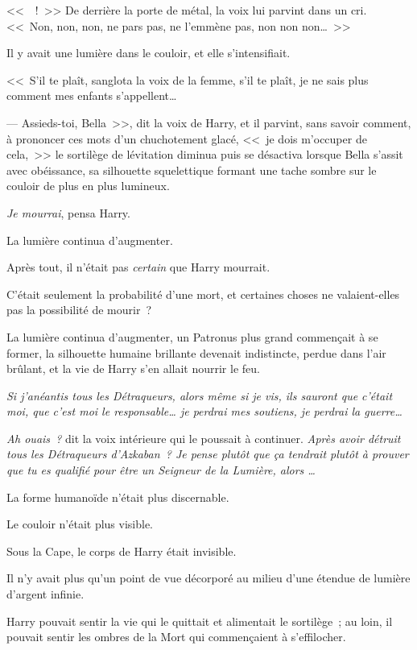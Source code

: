 <<~~!~>> De derrière la porte de métal, la voix lui parvint dans un cri. <<~Non, non, non, ne pars pas, ne l'emmène pas, non non non…~>>

Il y avait une lumière dans le couloir, et elle s'intensifiait.

<<~S'il te plaît, sanglota la voix de la femme, s'il te plaît, je ne sais plus comment mes enfants s'appellent…

--- Assieds-toi, Bella~>>, dit la voix de Harry, et il parvint, sans savoir comment, à prononcer ces mots d'un chuchotement glacé, <<~je dois m'occuper de cela,~>> le sortilège de lévitation diminua puis se désactiva lorsque Bella s'assit avec obéissance, sa silhouette squelettique formant une tache sombre sur le couloir de plus en plus lumineux.

\emph{Je mourrai}, pensa Harry.

La lumière continua d'augmenter.

Après tout, il n'était pas \emph{certain} que Harry mourrait.

C'était seulement la probabilité d'une mort, et certaines choses ne valaient-elles pas la possibilité de mourir~?

La lumière continua d'augmenter, un Patronus plus grand commençait à se former, la silhouette humaine brillante devenait indistincte, perdue dans l'air brûlant, et la vie de Harry s'en allait nourrir le feu.

\emph{Si j'anéantis tous les Détraqueurs, alors même si je vis, ils sauront que c'était moi, que c'est moi le responsable… je perdrai mes soutiens, je perdrai la guerre…}

\emph{Ah ouais~?} dit la voix intérieure qui le poussait à continuer. \emph{Après avoir détruit tous les Détraqueurs d'Azkaban~? Je pense plutôt que ça tendrait plutôt à prouver que tu es qualifié pour être un Seigneur de la Lumière, alors …}

La forme humanoïde n'était plus discernable.

Le couloir n'était plus visible.

Sous la Cape, le corps de Harry était invisible.

Il n'y avait plus qu'un point de vue décorporé au milieu d'une étendue de lumière d'argent infinie.

Harry pouvait sentir la vie qui le quittait et alimentait le sortilège~; au loin, il pouvait sentir les ombres de la Mort qui commençaient à s'effilocher.

